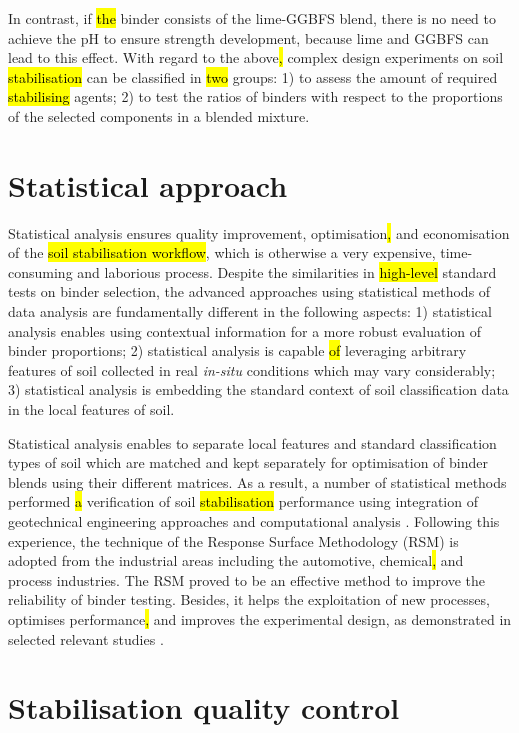 \documentclass[eprint,
]{actapoly}
\begin{document}
In contrast,\hl{ }if \hl{the} binder consists of the lime-GGBFS blend, there is no need to achieve the pH to ensure strength development, because lime and GGBFS can lead to this effect. With regard to the above\hl{,} complex design experiments on soil \hl{stabilisation} can be classified in \hl{two} groups: 1) to assess the amount of required \hl{stabilising} agents; 2) to test the ratios of binders with respect to the proportions of the selected components in a blended mixture. 

\section{Statistical approach}
Statistical analysis ensures quality improvement, optimisation\hl{, }and economisation of the \hl{soil stabilisation workflow}, which is otherwise a very expensive, time-consuming and laborious process. Despite the similarities in\hl{ high-level }standard tests on binder selection, the advanced approaches using statistical methods of data analysis are fundamentally different in the following aspects: 1) statistical analysis enables using\hl{ }contextual information for a more robust evaluation of binder proportions; 2) statistical analysis is capable \hl{of} leveraging arbitrary features of soil collected in real \emph{in-situ} conditions which may vary considerably; 3) statistical analysis is embedding the standard context of soil classification data in the local features of soil. 

Statistical analysis enables to separate local features and standard classification types of soil which are matched and kept separately for optimisation of binder blends using their different matrices. As a result, a number of statistical methods performed \hl{a} verification of soil \hl{stabilisation} performance using integration of geotechnical engineering approaches and computational analysis \citep{Eissaetal2022,ORourke,Najjar,Kallenetal2016,Ojo,Lindh2021a}. Following this experience, the technique of the Response Surface Methodology (RSM) is adopted from the industrial areas including the automotive, chemical\hl{, }and process industries. The RSM proved to be an effective method to improve the reliability of binder testing. Besides, it helps the exploitation of new processes, optimises performance\hl{, }and improves the experimental design, as demonstrated in selected relevant studies \citep{SUBHA2017285,BIAN2021116745,Myres,CHEN2022125723}.

\section{Stabilisation quality control}
\end{document}
